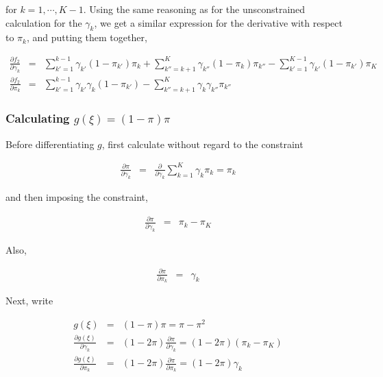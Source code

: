 \documentclass[11pt]{article}
\begin{document}
for $k = 1,\cdots, K-1$. Using the same reasoning as for the
unsconstrained calculation for the $\gamma_k$, we get a similar
expression for the derivative with respect to $\pi_k$, and putting them together, 

\begin{eqnarray}
\frac{\partial f_2}{\partial \gamma_{k} }  & = & 
                     \sum_{k'=1}^{k-1} \gamma_{k'} (1-\pi_{k'}) \pi_{k}
                     +\sum_{k'' = k+1}^K\gamma_{k''}(1-\pi_k)\pi_{k''}
                     -\sum_{k'=1}^{K-1} \gamma_{k'} (1-\pi_{k'})
                     \pi_{K} \\
\frac{\partial f_2}{\partial \pi_{k} }  & = & 
                      \sum_{k'=1}^{k-1} \gamma_{k'} \gamma_{k} (1-\pi_{k'})
                      - \sum_{k''= k+1}^K \gamma_{k} \gamma_{k''}\pi_{k''}
\end{eqnarray}



\subsubsection{Calculating $g(\xi)  =  (1-\pi)\pi$}

Before differentiating $g$, first calculate without regard to the
constraint

\begin{eqnarray}
\frac{\partial \pi}{\partial \gamma_{k} } & = & 
                    \frac{\partial }{\partial \gamma_{k} } \sum_{k=1}^K \gamma_k \pi_k
                    = \pi_k 
\end{eqnarray}

and then imposing the constraint,

\begin{eqnarray}
\frac{\partial \pi}{\partial \gamma_{k} } & = & \pi_k - \pi_K
\end{eqnarray}

Also,

\begin{eqnarray}
\frac{\partial \pi}{\partial \pi_{k} }& = & \gamma_k
\end{eqnarray}

Next, write

\begin{eqnarray}
g(\xi) & = &  (1-\pi) \pi = \pi - \pi^2 \\
\frac{\partial g(\xi)}{\partial \gamma_{k} } & = &  
                       (1-2\pi) \frac{\partial \pi}{\partial \gamma_{k} }
                       = (1-2\pi) (\pi_k - \pi_K) \\
\frac{\partial g(\xi)}{\partial \pi_{k} }  & = & 
                       (1-2\pi) \frac{\partial \pi}{\partial \pi_{k} }
                       = (1-2\pi) \gamma_k 
\end{eqnarray}
\end{document}
